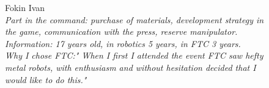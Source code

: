 \begin{figure}[H]
\begin{minipage}{0.47\linewidth}
	\end{minipage}
	\hfill
	\begin{minipage}{0.47\linewidth}
		Fokin Ivan\\
		\emph{Part in the command: purchase of materials,  development strategy in the game,  communication with the press, reserve  manipulator.\\ }
		\emph{Information: 17 years old, in robotics 5 years, in FTC 3 years. \\ } 
		\emph{Why I chose FTC:" When I first I attended the event FTC saw hefty metal robots, with enthusiasm and without hesitation decided that I would like to do this."}		
	\end{minipage}	
\end{figure}

\fillpage


